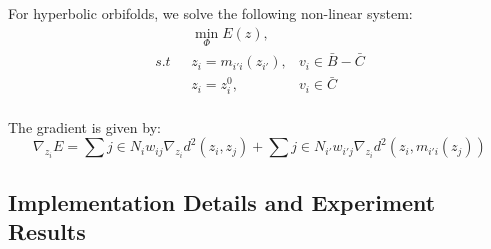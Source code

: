 For hyperbolic orbifolds, we solve the following non-linear system:
\begin{equation}
\begin{split}
&\min_{\Phi} E(z),&\\
s.t \ \ \ &z_i = m_{i'i}(z_{i'}), &v_i \in \bar{B} - \bar{C}\\
 &z_i = z_i^0, &v_i \in \bar{C}\\
\end{split}
\end{equation}

The gradient is given by:
\begin{equation}
\nabla_{z_i} E = \sum{j\in N_i}  w_{ij}\nabla_{z_i}d^2(z_i, z_j) + \sum{j\in N_{i'}}w_{i'j}\nabla_{z_i}d^2(z_i, m_{i'i}(z_j))
\end{equation}

\subsection{Implementation Details and Experiment Results}
